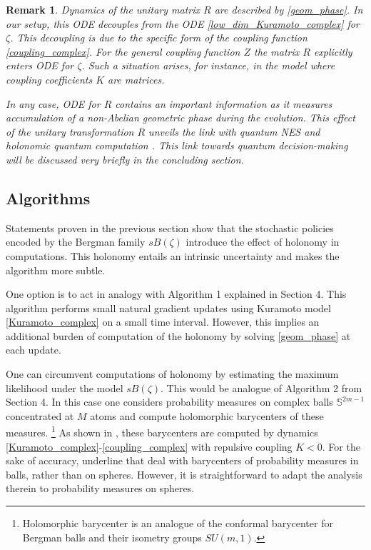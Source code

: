 \documentclass{article}
\theoremstyle{plain}%
\newtheorem{rem}{Remark}
\theoremstyle{definition}
\theoremstyle{remark}
\theoremstyle{prop}
\begin{document}
\begin{rem}
Dynamics of the unitary matrix $R$ are described by \eqref{geom_phase}. In our setup, this ODE decouples from the ODE \eqref{low_dim_Kuramoto_complex} for $\zeta$. This decoupling is due to the specific form of the coupling function \eqref{coupling_complex}. For the general coupling function $Z$ the matrix $R$ explicitly enters ODE for $\zeta$. Such a situation arises, for instance, in the model where coupling coefficients $K$ are matrices. 

In any case, ODE for $R$ contains an important information as it measures accumulation of a non-Abelian geometric phase during the evolution. This effect of the unitary transformation $R$ unveils the link with quantum NES \cite{ADA-G,ZCSV,SIKC} and holonomic quantum computation \cite{ZR}. This link towards quantum decision-making will be discussed very briefly in the concluding section.
\end{rem}
 

\subsection{Algorithms}

Statements proven in the previous section show that the stochastic policies encoded by the Bergman family $sB(\zeta)$ introduce the effect of holonomy in computations. This holonomy entails an intrinsic uncertainty and makes the algorithm more subtle. 

One option is to act in analogy with Algorithm 1 explained in Section 4. This algorithm performs small natural gradient updates using Kuramoto model \eqref{Kuramoto_complex} on a small time interval. However, this implies an additional burden of computation of the holonomy by solving \eqref{geom_phase} at each update. 

One can circumvent computations of holonomy by estimating the maximum likelihood under the model $sB(\zeta)$. This would be analogue of Algorithm 2 from Section 4. In this case one considers probability measures on complex balls $\mathbb S^{2m-1}$ concentrated at $M$ atoms and compute holomorphic barycenters of these measures. \footnote{Holomorphic barycenter is an analogue of the conformal barycenter for Bergman balls and their isometry groups $SU(m,1)$.} As shown in \cite{JK,JK2}, these barycenters are computed by dynamics \eqref{Kuramoto_complex}-\eqref{coupling_complex} with repulsive coupling $K<0$. For the sake of accuracy, underline that \cite{JK,JK2} deal with barycenters of probability measures in balls, rather than on spheres. However, it is straightforward to adapt the analysis therein to probability measures on spheres.
\end{document}
